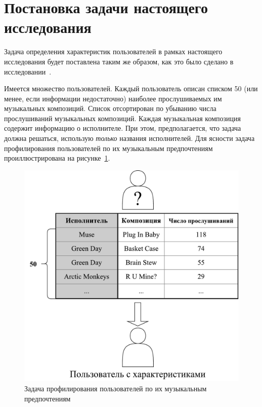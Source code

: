 \section{Постановка задачи настоящего исследования}
\label{sec:problem_formulation}

Задача определения характеристик пользователей в рамках настоящего
исследования будет поставлена таким же образом, как это было
сделано в исследовании~\cite{wu2014gender}.

Имеется множество пользователей. Каждый пользователь описан списком 50
(или менее, если информации недостаточно) наиболее прослушиваемых им
музыкальных композиций. Список отсортирован по убыванию числа
прослушиваний музыкальных композиций. Каждая музыкальная композиция
содержит информацию о исполнителе. При этом, предполагается, что задача
должна решаться, использую \textit{только} названия исполнителей. Для ясности
задача профилирования пользователей по их музыкальным предпочтениям
проиллюстрирована на рисунке~\ref{fig:problem_illustration}.

\begin{figure}[!h]
\caption{Задача профилирования пользователей
         по их музыкальным предпочтениям}
\label{fig:problem_illustration}
\centering
\includegraphics[scale=0.7]{figs/problem-illustration.pdf}
\end{figure}

